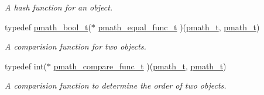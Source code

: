 \begin{CompactItemize}
\begin{CompactList}\small\item\em A hash function for an object. \item\end{CompactList}\item 
typedef \hyperlink{group__general__types_gc92090cb0b56345d6c379ed2341d4ef4}{pmath\_\-bool\_\-t}($\ast$ \hyperlink{group__objects_g3596be6b7da718f547985fdde3d8edd1}{pmath\_\-equal\_\-func\_\-t} )(\hyperlink{classpmath__t}{pmath\_\-t}, \hyperlink{classpmath__t}{pmath\_\-t})
\begin{CompactList}\small\item\em A comparision function for two objects. \item\end{CompactList}\item 
typedef int($\ast$ \hyperlink{group__objects_g9180e6d1f4ba84b77ea71414ce57677f}{pmath\_\-compare\_\-func\_\-t} )(\hyperlink{classpmath__t}{pmath\_\-t}, \hyperlink{classpmath__t}{pmath\_\-t})
\begin{CompactList}\small\item\em A comparision function to determine the order of two objects. \item\end{CompactList}\end{CompactItemize}
